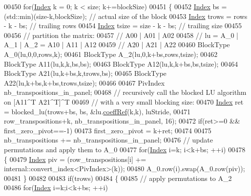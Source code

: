 \begin{DoxyCode}
00450     \textcolor{keywordflow}{for}(\hyperlink{group___core___module_a554f30542cc2316add4b1ea0a492ff02}{Index} k = 0; k < size; k+=blockSize)
00451     \{
00452       \hyperlink{group___core___module_a554f30542cc2316add4b1ea0a492ff02}{Index} bs = (std::min)(size-k,blockSize); \textcolor{comment}{// actual size of the block}
00453       \hyperlink{group___core___module_a554f30542cc2316add4b1ea0a492ff02}{Index} trows = rows - k - bs; \textcolor{comment}{// trailing rows}
00454       \hyperlink{group___core___module_a554f30542cc2316add4b1ea0a492ff02}{Index} tsize = size - k - bs; \textcolor{comment}{// trailing size}
00455 
00456       \textcolor{comment}{// partition the matrix:}
00457       \textcolor{comment}{//                          A00 | A01 | A02}
00458       \textcolor{comment}{// lu  = A\_0 | A\_1 | A\_2 =  A10 | A11 | A12}
00459       \textcolor{comment}{//                          A20 | A21 | A22}
00460       BlockType A\_0(lu,0,0,rows,k);
00461       BlockType A\_2(lu,0,k+bs,rows,tsize);
00462       BlockType A11(lu,k,k,bs,bs);
00463       BlockType A12(lu,k,k+bs,bs,tsize);
00464       BlockType A21(lu,k+bs,k,trows,bs);
00465       BlockType A22(lu,k+bs,k+bs,trows,tsize);
00466 
00467       PivIndex nb\_transpositions\_in\_panel;
00468       \textcolor{comment}{// recursively call the blocked LU algorithm on [A11^T A21^T]^T}
00469       \textcolor{comment}{// with a very small blocking size:}
00470       \hyperlink{group___core___module_a554f30542cc2316add4b1ea0a492ff02}{Index} ret = blocked\_lu(trows+bs, bs, &lu.\hyperlink{class_eigen_1_1_plain_object_base_a25626a55b26a4323565f79d1b7c48ea8}{coeffRef}(k,k), luStride,
00471                    row\_transpositions+k, nb\_transpositions\_in\_panel, 16);
00472       \textcolor{keywordflow}{if}(ret>=0 && first\_zero\_pivot==-1)
00473         first\_zero\_pivot = k+ret;
00474 
00475       nb\_transpositions += nb\_transpositions\_in\_panel;
00476       \textcolor{comment}{// update permutations and apply them to A\_0}
00477       \textcolor{keywordflow}{for}(\hyperlink{group___core___module_a554f30542cc2316add4b1ea0a492ff02}{Index} i=k; i<k+bs; ++i)
00478       \{
00479         \hyperlink{group___core___module_a554f30542cc2316add4b1ea0a492ff02}{Index} piv = (row\_transpositions[i] += internal::convert\_index<PivIndex>(k));
00480         A\_0.row(i).swap(A\_0.row(piv));
00481       \}
00482 
00483       \textcolor{keywordflow}{if}(trows)
00484       \{
00485         \textcolor{comment}{// apply permutations to A\_2}
00486         \textcolor{keywordflow}{for}(\hyperlink{group___core___module_a554f30542cc2316add4b1ea0a492ff02}{Index} i=k;i<k+bs; ++i)

\end{DoxyCode}
